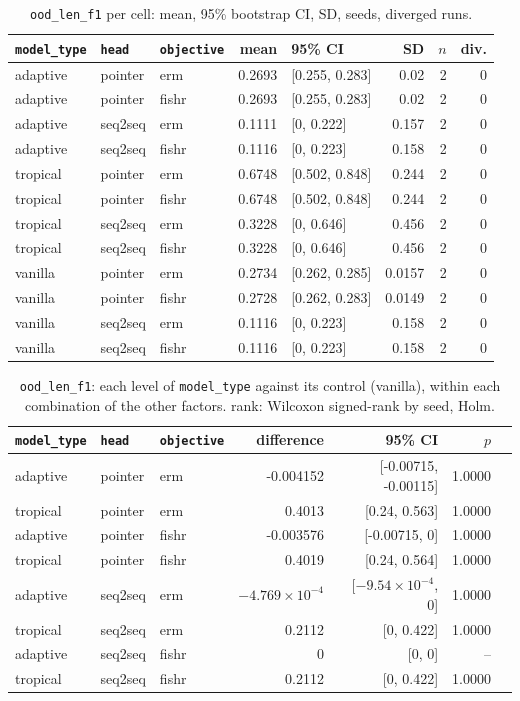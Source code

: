 \documentclass[10pt]{article}
\begin{document}
{\small
\begin{longtable}{lllrlrrr}
\caption{\texttt{ood\_len\_f1} per cell: mean, 95\% bootstrap CI, SD, seeds, diverged runs.}\label{tab:summary-ood_len_f1}\\
\toprule
\texttt{model\_type} & \texttt{head} & \texttt{objective} & mean & 95\% CI & SD & $n$ & div.\\
\midrule
\endhead
adaptive & pointer & erm & 0.2693 & [0.255, 0.283] & 0.02 & 2 & 0\\
adaptive & pointer & fishr & 0.2693 & [0.255, 0.283] & 0.02 & 2 & 0\\
adaptive & seq2seq & erm & 0.1111 & [0, 0.222] & 0.157 & 2 & 0\\
adaptive & seq2seq & fishr & 0.1116 & [0, 0.223] & 0.158 & 2 & 0\\
tropical & pointer & erm & 0.6748 & [0.502, 0.848] & 0.244 & 2 & 0\\
tropical & pointer & fishr & 0.6748 & [0.502, 0.848] & 0.244 & 2 & 0\\
tropical & seq2seq & erm & 0.3228 & [0, 0.646] & 0.456 & 2 & 0\\
tropical & seq2seq & fishr & 0.3228 & [0, 0.646] & 0.456 & 2 & 0\\
vanilla & pointer & erm & 0.2734 & [0.262, 0.285] & 0.0157 & 2 & 0\\
vanilla & pointer & fishr & 0.2728 & [0.262, 0.283] & 0.0149 & 2 & 0\\
vanilla & seq2seq & erm & 0.1116 & [0, 0.223] & 0.158 & 2 & 0\\
vanilla & seq2seq & fishr & 0.1116 & [0, 0.223] & 0.158 & 2 & 0\\
\bottomrule
\end{longtable}
}

{\small
\begin{longtable}{lllrrrl}
\caption{\texttt{ood\_len\_f1}: each level of \texttt{model\_type} against its control (vanilla), within each combination of the other factors. rank: Wilcoxon signed-rank by seed, Holm.}\label{tab:control-ood_len_f1}\\
\toprule
\texttt{model\_type} & \texttt{head} & \texttt{objective} & difference & 95\% CI & $p$ & \\
\midrule
\endhead
adaptive & pointer & erm & -0.004152 & [-0.00715, -0.00115] & 1.0000 & \\
tropical & pointer & erm & 0.4013 & [0.24, 0.563] & 1.0000 & \\
adaptive & pointer & fishr & -0.003576 & [-0.00715, 0] & 1.0000 & \\
tropical & pointer & fishr & 0.4019 & [0.24, 0.564] & 1.0000 & \\
adaptive & seq2seq & erm & $-4.769\times10^{-4}$ & [$-9.54\times10^{-4}$, 0] & 1.0000 & \\
tropical & seq2seq & erm & 0.2112 & [0, 0.422] & 1.0000 & \\
adaptive & seq2seq & fishr & 0 & [0, 0] & -- & \\
tropical & seq2seq & fishr & 0.2112 & [0, 0.422] & 1.0000 & \\
\bottomrule
\end{longtable}
}
\end{document}
